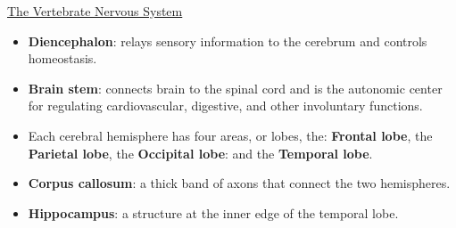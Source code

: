 \documentclass[12pt,letterpaper]{article}
\begin{document}
\begin{secbox}{\hyperlink{43}{The Vertebrate Nervous System}}
{\begin{itemize}
\begin{itemize}
                \item \textbf{Diencephalon}: relays sensory information to the cerebrum and controls homeostasis.
                \item \textbf{Brain stem}: connects brain to the spinal cord and is the autonomic center for regulating cardiovascular, digestive, and other involuntary functions.
                \item Each cerebral hemisphere has four areas, or lobes, the: \textbf{Frontal lobe}, the \textbf{Parietal lobe}, the \textbf{Occipital lobe}: and the \textbf{Temporal lobe}.
                \item \textbf{Corpus callosum}: a thick band of axons that connect the two hemispheres.
                \item \textbf{Hippocampus}: a structure at the inner edge of the temporal lobe. 
            \end{itemize}
    \end{itemize}
}\end{secbox}
\end{document}
